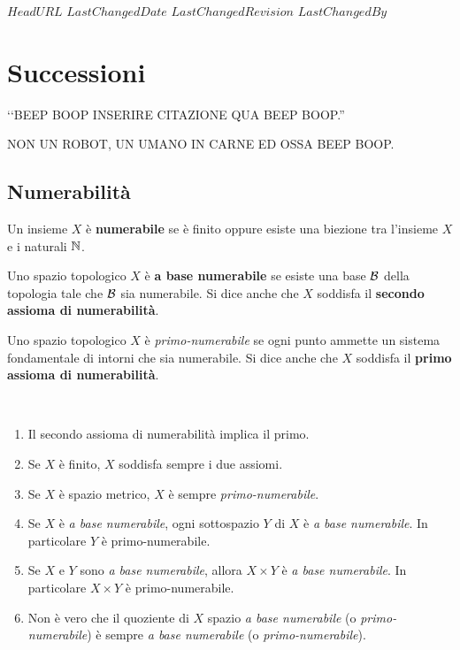 \svnidlong
{$HeadURL$}
{$LastChangedDate$}
{$LastChangedRevision$}
{$LastChangedBy$}

\chapter{Successioni}

\begin{introduction}
‘‘BEEP BOOP INSERIRE CITAZIONE QUA BEEP BOOP.''
\begin{flushright}
	\textsc{NON UN ROBOT,} UN UMANO IN CARNE ED OSSA BEEP BOOP.
\end{flushright}
\end{introduction}

\section{Numerabilità}
\begin{define}
Un insieme $X$ è \textbf{numerabile} se è finito oppure esiste una biezione tra l'insieme $X$ e i naturali $\mathbb{N}$.
\end{define}
\begin{define}
Uno spazio topologico $X$ è \textbf{a base numerabile} se esiste una base $\mathcal{B}$ della topologia tale che $\mathcal{B}$ sia numerabile. %
Si dice anche che $X$ soddisfa il \textbf{secondo assioma di numerabilità}.
\end{define}
\begin{define}
Uno spazio topologico $X$ è \textit{primo-numerabile} se ogni punto ammette un sistema fondamentale di intorni che sia numerabile. Si dice anche che $X$ soddisfa il \textbf{primo assioma di numerabilità}.
\end{define}
\begin{observe}~{}
\begin{enumerate}
\item Il secondo assioma di numerabilità implica il primo.
\item Se $X$ è finito, $X$ soddisfa sempre i due assiomi.
\item Se $X$ è spazio metrico, $X$ è sempre \textit{primo-numerabile}.
\item Se $X$ è \textit{a base numerabile}, ogni sottospazio $Y$ di $X$ è \textit{a base numerabile}. In particolare $Y$ è primo-numerabile.
\item Se $X$ e $Y$ sono \textit{a base numerabile}, allora $X\times Y$ è \textit{a base numerabile}. In particolare $X\times Y$ è primo-numerabile.
\item Non è vero che il quoziente di $X$ spazio \textit{a base numerabile} (o \textit{primo-numerabile}) è sempre \textit{a base numerabile} (o \textit{primo-numerabile}).
\end{enumerate}
\end{observe}
